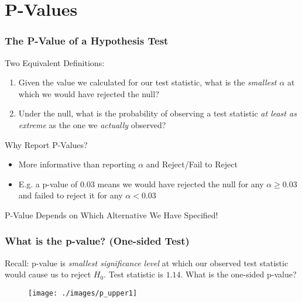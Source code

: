 \documentclass{beamer}
\begin{document}
\section{P-Values}
\begin{frame}
	\frametitle{The P-Value of a Hypothesis Test}
	\begin{block}
		{Two Equivalent Definitions:}
		\begin{enumerate}
			\item Given the value we calculated for our test statistic, what is the \emph{smallest $\alpha$} at which we would have rejected the null?
			\item Under the null, what is the probability of observing a test statistic \emph{at least as extreme} as the one we \emph{actually} observed?
		\end{enumerate}
	\end{block}
	\begin{block}
		{Why Report P-Values?}
		\begin{itemize}
			\item More informative than reporting $\alpha$ and Reject/Fail to Reject
			\item E.g. a p-value of 0.03 means we would have rejected the null for any $\alpha \geq 0.03$ and failed to reject it for any $\alpha < 0.03$ 
		\end{itemize}
	\end{block}
\end{frame}

\begin{frame}
\begin{center}
\huge P-Value Depends on Which Alternative We Have Specified!
\end{center}
\end{frame}

\begin{frame}
\frametitle{What is the p-value? (One-sided Test)}
\footnotesize
Recall: p-value is \emph{smallest significance level} at which our observed test statistic would cause us to reject $H_0$. \alert{Test statistic is $1.14$. What is the one-sided p-value? }
\begin{figure}
\texttt{[image: ./images/p\_upper1]}

\end{figure}

\end{frame}
\end{document}
